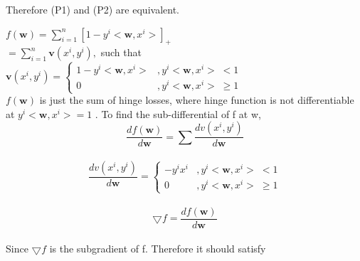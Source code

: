 \documentclass[a4paper,11pt]{article}
\begin{document}
\begin{mlsolution}
Therefore (P1) and (P2) are equivalent.

\end{mlsolution}

\begin{mlsolution}

\begin{math}f \left ( \textbf{w} \right ) = \sum_{i=1}^{n} \left [  1 - y^{i}<\textbf{w}, x^{i}> \right ]_{+}\end{math}\\

\begin{math}
= \sum_{i=1}^{n} \textbf{v}\left ( x^{i}, y^{i} \right ),\end{math} such that \begin{math}\textbf{v}\left ( x^{i}, y^{i} \right ) = \left\{\begin{matrix}
1 - y^{i}<\textbf{w}, x^{i}> &, y^{i}<\textbf{w}, x^{i}> \;<  1\\
0 & , y^{i}<\textbf{w}, x^{i}> \;\geq  1
\end{matrix}\right.
\end{math}\\

\begin{math}
f\left ( \textbf{w} \right )
\end{math} is just the sum of hinge losses, where hinge function is not differentiable at \begin{math}y^{i}<\textbf{w}, x^{i}> = 1\end{math} . To find the sub-differential of f at w, \\

\[
\frac{df\left ( \textbf{w} \right )}{d\textbf{w}} = \sum \frac{dv\left ( x^{i}, y^{i} \right )}{d\textbf{w}}
\]\\

\[
\frac{dv\left ( x^{i}, y^{i} \right )}{d\textbf{w}} = \left\{\begin{matrix}
-y^{i}x^{i} &,  y^{i}<\textbf{w}, x^{i}> \;<  1\\ 
0 & , y^{i}<\textbf{w}, x^{i}> \;\geq  1
\end{matrix}\right.
\]\\

\[
\bigtriangledown f = \frac{df\left ( \textbf{w} \right )}{d\textbf{w}}
\]\\

Since \begin{math}\bigtriangledown f\end{math} is the subgradient of f. Therefore it should satisfy \\


\end{mlsolution}
\end{document}
